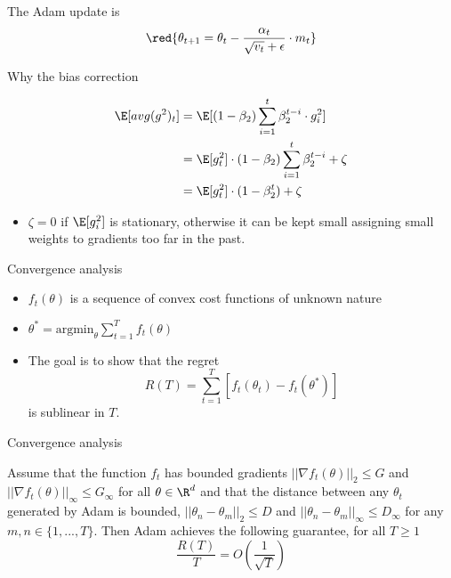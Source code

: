 \documentclass[english]{article}
\begin{document}
The Adam update is
$$\red{\theta_{t+1} = \theta_t - \frac{\alpha_t}{\sqrt{v_t} + \epsilon} \cdot m_t}$$










\item {Why the bias correction}

\begin{align*}
\E[avg(g^2)_t] &= \E[(1- \beta_2) \sum_{i=1}^t \beta_2^{t-i} \cdot g_i^2]\\ 
&= \E[g^2_t] \cdot (1- \beta_2) \sum_{i=1}^t \beta_2^{t-i} + \zeta \\
&= \E[g^2_t] \cdot (1- \beta_2^t) + \zeta
\end{align*}


\begin{itemize}
\item $\zeta = 0$ if $\E[g_i^2]$ is stationary, otherwise it can be kept small assigning small weights to gradients too far in the past.
\end{itemize}








\item {Convergence analysis}
\begin{itemize}
\item $f_t(\theta)$ is a sequence of convex cost functions of unknown nature 
\item $\theta^* = \text{argmin}_\theta \sum_{t=1}^T f_t(\theta)$ 
\item The goal is to show that the regret
$$R(T) = \sum_{t=1}^T [f_t(\theta_t) - f_t(\theta^*)]$$
is sublinear in $T$.
\end{itemize}










\item {Convergence analysis}

\begin{thm}
Assume that the function $f_t$ has bounded gradients $||\nabla f_t(\theta)||_2 \leq G$ and $||\nabla f_t(\theta)||_\infty \leq G_\infty$ for all $\theta \in \R^d$ and that the distance between any $\theta_t$  generated by Adam is bounded, $||\theta_n - \theta_m ||_2 \leq D$ and $||\theta_n - \theta_m||_\infty \leq D_\infty$ for any $m, n \in \{1, ..., T \}$. Then Adam achieves the following guarantee, for all $T \geq 1$
$$\frac{R(T)}{T} = O(\frac{1}{\sqrt{T}})$$
\end{thm}
\end{document}
